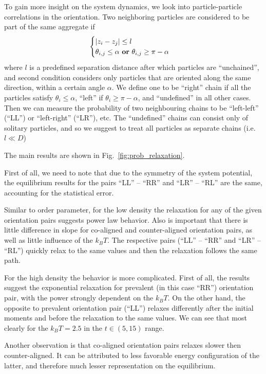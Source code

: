 To gain more insight on the system dynamics, we look into particle-particle correlations in the orientation.
Two neighboring particles are considered to be part of the same aggregate if
\begin{equation}
\label{eq:chains_definition}
\begin{cases}
	|z_i - z_j| \leq l \\
	\theta_{i, j} \leq \alpha \text{ \textbf{or} } \theta_{i, j} \geq \pi - \alpha
\end{cases}
\end{equation}
where $l$ is a predefined separation distance after which particles are ``unchained'', and second condition considers only particles that are oriented along the same direction, within a certain angle $\alpha$. We define one to be ``right'' chain if all the particles satisfy $\theta_i \leq \alpha$, ``left'' if $\theta_i \geq \pi - \alpha$, and ``undefined'' in all other cases. Then we can measure the probability of two neighbouring chains to be ``left-left'' (``LL'') or ``left-right'' (``LR''), etc. The ``undefined'' chains can consist only of solitary particles, and so we suggest to treat all particles as separate chains (i.e. $l \ll D$)

The main results are shown in Fig.~\ref{fig:prob_relaxation}.

First of all, we need to note that due to the symmetry of the system potential, the equilibrium results for the pairs ``LL'' -- ``RR'' and ``LR'' -- ``RL'' are the same, accounting for the statistical error.

Similar to order parameter, for the low density the relaxation for any of the given orientation pairs suggests power law behavior. Also is important that there is little difference in slope for co-aligned and counter-aligned orientation pairs, as well as little influence of the $k_BT$. The respective pairs (``LL'' -- ``RR'' and ``LR'' -- ``RL'') quickly relax to the same values and then the relaxation follows the same path.

For the high density the behavior is more complicated. First of all, the results suggest the exponential relaxation for prevalent (in this case ``RR'') orientation pair, with the power strongly dependent on the $k_BT$. On the other hand, the opposite to prevalent orientation pair (``LL'') relaxes differently after the initial moments and before the relaxation to the same values. We can see that most clearly for the $k_BT = 2.5$ in the $t \in (5, 15)$ range.

Another observation is that co-aligned orientation pairs relaxes slower then counter-aligned. It can be attributed to less favorable energy configuration of the latter, and therefore much lesser representation on the equilibrium.

